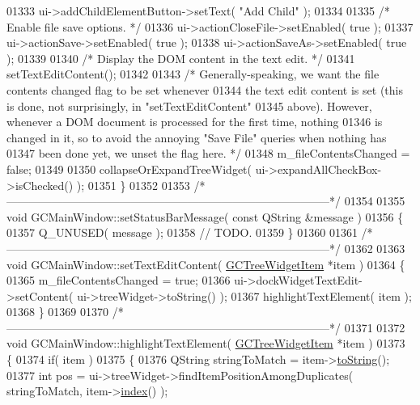 \begin{DoxyCode}
{{{{{{{01333   ui->addChildElementButton->setText( \textcolor{stringliteral}{"Add Child"} );
01334 
01335   \textcolor{comment}{/* Enable file save options. */}
01336   ui->actionCloseFile->setEnabled( \textcolor{keyword}{true} );
01337   ui->actionSave->setEnabled( \textcolor{keyword}{true} );
01338   ui->actionSaveAs->setEnabled( \textcolor{keyword}{true} );
01339 
01340   \textcolor{comment}{/* Display the DOM content in the text edit. */}
01341   setTextEditContent();
01342 
01343   \textcolor{comment}{/* Generally-speaking, we want the file contents changed flag to be set
       whenever}
01344 \textcolor{comment}{    the text edit content is set (this is done, not surprisingly, in
       "setTextEditContent"}
01345 \textcolor{comment}{    above).  However, whenever a DOM document is processed for the first time,
       nothing}
01346 \textcolor{comment}{    is changed in it, so to avoid the annoying "Save File" queries when nothing
       has}
01347 \textcolor{comment}{    been done yet, we unset the flag here. */}
01348   m\_fileContentsChanged = \textcolor{keyword}{false};
01349 
01350   collapseOrExpandTreeWidget( ui->expandAllCheckBox->isChecked() );
01351 \}
01352 
01353 \textcolor{comment}{/*
      --------------------------------------------------------------------------------------*/}
01354 
01355 \textcolor{keywordtype}{void} GCMainWindow::setStatusBarMessage( \textcolor{keyword}{const} QString &message )
01356 \{
01357     Q\_UNUSED( message );
01358   \textcolor{comment}{// TODO.}
01359 \}
01360 
01361 \textcolor{comment}{/*
      --------------------------------------------------------------------------------------*/}
01362 
01363 \textcolor{keywordtype}{void} GCMainWindow::setTextEditContent( \hyperlink{class_g_c_tree_widget_item}{GCTreeWidgetItem} *item )
01364 \{
01365   m\_fileContentsChanged = \textcolor{keyword}{true};
01366   ui->dockWidgetTextEdit->setContent( ui->treeWidget->toString() );
01367   highlightTextElement( item );
01368 \}
01369 
01370 \textcolor{comment}{/*
      --------------------------------------------------------------------------------------*/}
01371 
01372 \textcolor{keywordtype}{void} GCMainWindow::highlightTextElement( \hyperlink{class_g_c_tree_widget_item}{GCTreeWidgetItem} *item )
01373 \{
01374   \textcolor{keywordflow}{if}( item )
01375   \{
01376     QString stringToMatch = item->\hyperlink{class_g_c_tree_widget_item_acbd4573d56cc5c6d9bd58c461b797115}{toString}();
01377     \textcolor{keywordtype}{int} pos = ui->treeWidget->findItemPositionAmongDuplicates( stringToMatch, 
      item->\hyperlink{class_g_c_tree_widget_item_af6b48ae274cc4989811ef44944c8ad76}{index}() );
}}}}}}}
\end{DoxyCode}
